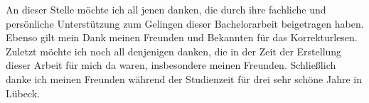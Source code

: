 \begin{acknowledgements}
	An dieser Stelle möchte ich all jenen danken, die durch ihre fachliche und persönliche Unterstützung zum Gelingen dieser Bachelorarbeit beigetragen haben. \newline \newline
	Ebenso gilt mein Dank meinen Freunden und Bekannten für das Korrekturlesen. Zuletzt möchte ich noch all denjenigen danken, die in der Zeit der Erstellung dieser Arbeit für mich da waren, insbesondere meinen Freunden. \newline \newline
	Schließlich danke ich meinen Freunden während der Studienzeit für drei sehr schöne Jahre in Lübeck.
\end{acknowledgements}